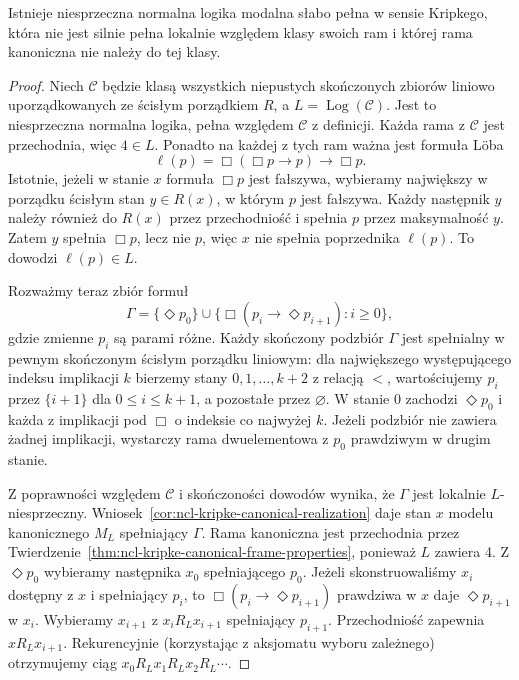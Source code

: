 \begin{twierdzenie}
\label{thm:ncl-kripke-complete-noncanonical}
Istnieje niesprzeczna normalna logika modalna
słabo pełna w sensie Kripkego, która nie jest
silnie pełna lokalnie względem klasy swoich
ram i której rama kanoniczna nie należy
do tej klasy.
\end{twierdzenie}
\begin{proof}
Niech $\mathcal C$ będzie klasą wszystkich
niepustych skończonych zbiorów liniowo
uporządkowanych ze ścisłym porządkiem $R$,
a $L=\operatorname{Log}(\mathcal C)$.
Jest to niesprzeczna normalna logika,
pełna względem $\mathcal C$ z definicji.
Każda rama z $\mathcal C$ jest przechodnia,
więc $4\in L$.
Ponadto na każdej z tych ram ważna jest
formuła Löba
\[
 \ell(p)=\Box(\Box p\to p)\to\Box p.
\]
Istotnie, jeżeli w stanie $x$ formuła $\Box p$
jest fałszywa, wybieramy największy w porządku ścisłym
stan $y\in R(x)$,
w którym $p$ jest fałszywa. Każdy następnik
$y$ należy również do $R(x)$ przez przechodniość
i spełnia $p$ przez maksymalność $y$.
Zatem $y$ spełnia $\Box p$, lecz nie $p$,
więc $x$ nie spełnia poprzednika $\ell(p)$.
To dowodzi $\ell(p)\in L$.

Rozważmy teraz zbiór formuł
\[
 \Gamma=\{\Diamond p_0\}
 \cup\{\Box(p_i\to\Diamond p_{i+1}):i\geq0\},
\]
gdzie zmienne $p_i$ są parami różne.
Każdy skończony podzbiór $\Gamma$ jest
spełnialny w pewnym skończonym ścisłym
porządku liniowym: dla największego
występującego indeksu implikacji $k$
bierzemy stany $0,1,\ldots,k+2$ z relacją
$<$, wartościujemy $p_i$ przez $\{i+1\}$
dla $0\leq i\leq k+1$, a pozostałe
przez $\varnothing$. W stanie $0$ zachodzi
$\Diamond p_0$ i każda z implikacji
pod $\Box$ o indeksie co najwyżej $k$.
Jeżeli podzbiór nie zawiera żadnej
implikacji, wystarczy rama dwuelementowa
z $p_0$ prawdziwym w drugim stanie.

Z poprawności względem $\mathcal C$ i
skończoności dowodów wynika, że $\Gamma$
jest lokalnie $L$-niesprzeczny.
Wniosek~\ref{cor:ncl-kripke-canonical-realization}
daje stan $x$ modelu kanonicznego $M_L$
spełniający $\Gamma$. Rama kanoniczna
jest przechodnia przez
Twierdzenie~\ref{thm:ncl-kripke-canonical-frame-properties},
ponieważ $L$ zawiera 4.
Z $\Diamond p_0$ wybieramy następnika $x_0$
spełniającego $p_0$. Jeżeli skonstruowaliśmy
$x_i$ dostępny z $x$ i spełniający $p_i$,
to $\Box(p_i\to\Diamond p_{i+1})$ prawdziwa
w $x$ daje $\Diamond p_{i+1}$ w $x_i$.
Wybieramy $x_{i+1}$ z $x_iR_Lx_{i+1}$
spełniający $p_{i+1}$. Przechodniość
zapewnia $xR_Lx_{i+1}$.
Rekurencyjnie (korzystając z aksjomatu wyboru
zależnego) otrzymujemy ciąg
$x_0R_Lx_1R_Lx_2R_L\cdots$.


\end{proof}

